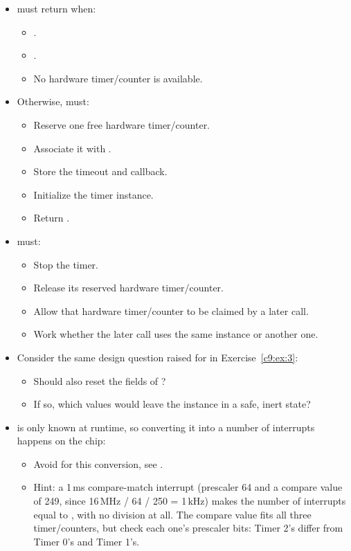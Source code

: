 \begin{itemize}
  \item {} must return  when:
  \begin{itemize}
    \item {}.
    \item {}.
    \item No hardware timer/counter is available.
  \end{itemize}
  \item Otherwise,  must:
  \begin{itemize}
    \item Reserve one free hardware timer/counter.
    \item Associate it with .
    \item Store the timeout and callback.
    \item Initialize the timer instance.
    \item Return .
  \end{itemize}
  \item {} must:
  \begin{itemize}
    \item Stop the timer.
    \item Release its reserved hardware timer/counter.
    \item Allow that hardware timer/counter to be claimed by a later  call.
    \item Work whether the later call uses the same  instance or another one.
  \end{itemize}
  \item Consider the same design question raised for  in
    Exercise~\ref{c9:ex:3}:
  \begin{itemize}
    \item Should  also reset the fields of ?
    \item If so, which values would leave the instance in a safe, inert state?
  \end{itemize}
  \item {} is only known at runtime, so converting it into a number of interrupts
    happens on the chip:
  \begin{itemize}
    \item Avoid  for this conversion, see .
    \item Hint: a 1\,ms compare-match interrupt (prescaler 64 and a compare value of 249, since
      16\,MHz / 64 / 250 = 1\,kHz) makes the number of interrupts equal to , with
      no division at all. The compare value fits all three timer/counters, but check each one's
      prescaler bits: Timer 2's differ from Timer 0's and Timer 1's.
  \end{itemize}
\end{itemize}


